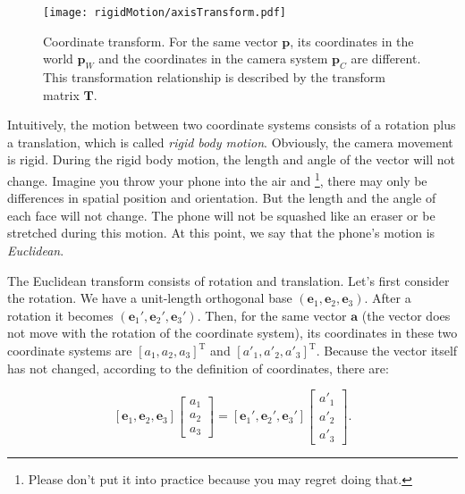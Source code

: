 \begin{figure}[!htp]
    \centering
    \texttt{[image: rigidMotion/axisTransform.pdf]}
    \caption {Coordinate transform. For the same vector $ \mathbf{p}$, its coordinates in the world $\mathbf{p}_W$ and the coordinates in the camera system $ \mathbf{p}_C$ are different. This transformation relationship is described by the transform matrix $ \mathbf{T} $.}
    \label{fig:axisTransform}
\end{figure}

Intuitively, the motion between two coordinate systems consists of a rotation plus a translation, which is called \textit{rigid body motion}. Obviously, the camera movement is rigid. During the rigid body motion, the length and angle of the vector will not change. Imagine you throw your phone into the air and \footnote {Please don't put it into practice because you may regret doing that.}, there may only be differences in spatial position and orientation. But the length and the angle of each face will not change. The phone will not be squashed like an eraser or be stretched during this motion. At this point, we say that the phone's motion is  \textit {Euclidean}.

The Euclidean transform consists of rotation and translation. Let's first consider the rotation. We have a unit-length orthogonal base $ ( \mathbf {e}_ 1, \mathbf {e}_ 2, \mathbf {e}_ 3 ) $. After a rotation it becomes $ ( \mathbf {e}_ 1 ', \mathbf {e}_ 2 ', \mathbf {e}_ 3 ') $. Then, for the same vector $ \mathbf {a} $ (the vector does not move with the rotation of the coordinate system), its coordinates in these two coordinate systems are $ [a_ 1, a_ 2, a_ 3 ] ^ \mathrm {T} $ and $[a'_ 1, a'_ 2, a'_ 3 ]^ \mathrm {T} $. Because the vector itself has not changed, according to the definition of coordinates, there are:

\begin{equation}
\left[ \mathbf{e}_1,\mathbf{e}_2,\mathbf{e}_3 \right]\left[ \begin{array}{l}
{a_1}\\
{a_2}\\
{a_3}
\end{array} \right] = \left[ \mathbf{e}_1', \mathbf{e}_2', \mathbf{e}_3' \right]\left[ \begin{array}{l}
a'_1\\
a'_2\\
a'_3
\end{array} \right].
\end{equation}

